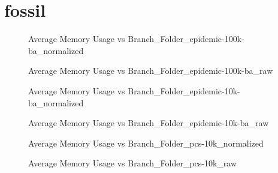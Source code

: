 \section{fossil}
\begin{figure}[H]
\centering

\caption{Average Memory Usage vs Branch\_Folder\_epidemic-100k-ba\_normalized}
\end{figure}
\vspace{1cm}
\begin{figure}[H]
\centering

\caption{Average Memory Usage vs Branch\_Folder\_epidemic-100k-ba\_raw}
\end{figure}
\vspace{1cm}
\newpage
\begin{figure}[H]
\centering

\caption{Average Memory Usage vs Branch\_Folder\_epidemic-10k-ba\_normalized}
\end{figure}
\vspace{1cm}
\begin{figure}[H]
\centering

\caption{Average Memory Usage vs Branch\_Folder\_epidemic-10k-ba\_raw}
\end{figure}
\vspace{1cm}
\newpage
\begin{figure}[H]
\centering

\caption{Average Memory Usage vs Branch\_Folder\_pcs-10k\_normalized}
\end{figure}
\vspace{1cm}
\begin{figure}[H]
\centering

\caption{Average Memory Usage vs Branch\_Folder\_pcs-10k\_raw}
\end{figure}
